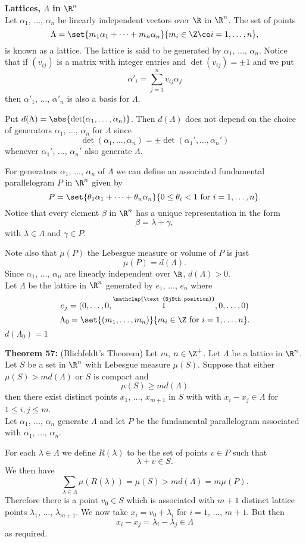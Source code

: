\textbf{Lattices, $\Lambda$ in $\R^n$} \\
Let $\alpha_1$, $\dotsc$, $\alpha_n$ be linearly independent vectors over $\R$ in $\R^n$.  The set of points
\[ \Lambda = \set{m_1\alpha_1+\dotsb+m_n\alpha_n}{m_i\in\Z\co i=1,\dotsc,n} , \]
is known as a lattice.  The lattice is said to be generated by $\alpha_1$, $\dotsc$, $\alpha_n$.  Notice that if $(v_{ij})$ is a matrix with integer entries and $\det(v_{ij})=\pm1$ and we put
\[ \alpha'_i = \sum_{j=1}^n v_{ij}\alpha_j \]
then $\alpha'_1$, $\dotsc$, $\alpha'_n$ is also a basis for $\Lambda$.

Put $d(\Lambda)=\abs{\det(\alpha_1,\dotsc,\alpha_n)}$.  Then $d(\Lambda)$ does not depend on the choice of generators $\alpha_1$, $\dotsc$, $\alpha_n$ for $\Lambda$ since
\[ \det(\alpha_1,\dotsc,\alpha_n) = \pm \det(\alpha_1',\dotsc,\alpha_n') \]
whenever $\alpha_1'$, $\dotsc$, $\alpha_n'$ also generate $\Lambda$.

For generators $\alpha_1$, $\dotsc$, $\alpha_n$ of $\Lambda$ we can define an associated fundamental parallelogram $P$ in $\R^n$ given by
\[ P = \set{\theta_1\alpha_1+\dotsb+\theta_n\alpha_n}{0\leq\theta_i<1\text{ for }i=1,\dotsc,n} . \]
Notice that every element $\beta$ in $\R^n$ has a unique representation in the form
\[ \beta = \lambda + \gamma , \]
with $\lambda\in\Lambda$ and $\gamma\in P$.

Note also that $\mu(P)$ the Lebesgue measure or volume of $P$ is just
\[ \mu(P) = d(\Lambda) . \]
\remark Since $\alpha_1$, $\dotsc$, $\alpha_n$ are linearly independent over $\R$, $d(\Lambda)>0$. \\
\eg Let $\Lambda$ be the lattice in $\R^n$ generated by $e_1$, $\dotsc$, $e_n$ where
\[ e_j = (0,\dotsc,0,\overset{\mathclap{\text{$j$th position}}}{1},0,\dotsc,0) \]
\[ \Lambda_0 = \set{(m_1,\dotsc,m_n)}{m_i\in\Z\text{ for }i=1,\dotsc,n} . \]
$d(\Lambda_0)=1$

\textbf{Theorem 57:} (Blichfeldt's Theorem) Let $m$, $n\in\Z^+$.  Let $\Lambda$ be a lattice in $\R^n$.  Let $S$ be a set in $\R^n$ with Lebesgue measure $\mu(S)$.  Suppose that either $\mu(S)>md(\Lambda)$ or $S$ is compact and
\[ \mu(S) \geq md(\Lambda) \]
then there exist distinct points $x_1$, $\dotsc$, $x_{m+1}$ in $S$ with with $x_i-x_j\in\Lambda$ for $1\leq i,j\leq m$. \\
\pf Let $\alpha_1$, $\dotsc$, $\alpha_n$ generate $\Lambda$ and let $P$ be the fundamental parallelogram associated with $\alpha_1$, $\dotsc$, $\alpha_n$.

For each $\lambda\in\Lambda$ we define $R(\lambda)$ to be the set of points $v\in P$ such that
\[ \lambda + v \in S . \]
We then have
\[ \sum_{\lambda\in\Lambda}\mu(R(\lambda)) = \mu(S) > md(\Lambda) = m\mu(P) . \]
Therefore there is a point $v_0\in S$ which is associated with $m+1$ distinct lattice points $\lambda_1$, $\dotsc$, $\lambda_{m+1}$.  We now take $x_i=v_0+\lambda_i$ for $i=1$, $\dotsc$, $m+1$.  But then
\[ x_i - x_j = \lambda_i - \lambda_j \in \Lambda \]
as required.

